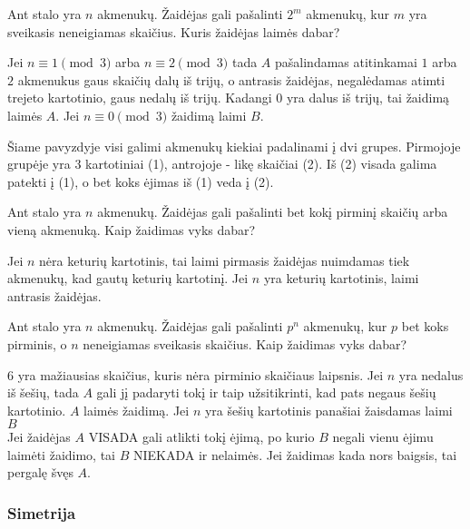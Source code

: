 \begin{pavnr}
  Ant stalo yra $n$ akmenukų. Žaidėjas gali pašalinti $2^{m}$ akmenukų, kur
  $m$ yra sveikasis neneigiamas skaičius. Kuris žaidėjas laimės dabar?
\end{pavnr}

Jei  $ n\equiv1\pmod{3} $ arba $ n\equiv2\pmod{3} $ tada $A$ pašalindamas
atitinkamai $1$ arba $2$ akmenukus gaus skaičių dalų iš trijų, o antrasis
žaidėjas, negalėdamas atimti trejeto kartotinio, gaus nedalų iš trijų.
Kadangi $0$ yra dalus iš trijų, tai žaidimą laimės $A$. Jei $ n\equiv0\pmod{3}
$ žaidimą laimi $B$.

\begin{pastaba}Šiame pavyzdyje visi galimi akmenukų kiekiai padalinami į
  dvi grupes. Pirmojoje grupėje yra $3$ kartotiniai (1), antrojoje - likę
  skaičiai (2). Iš (2) visada galima patekti į (1), o bet koks ėjimas iš
  (1) veda į (2).
\end{pastaba} 

\begin{pavnr}
  Ant stalo yra $n$ akmenukų. Žaidėjas gali pašalinti bet kokį pirminį skaičių
  arba vieną akmenuką. Kaip žaidimas vyks dabar?
\end{pavnr}

Jei $n$ nėra keturių kartotinis, tai laimi pirmasis žaidėjas nuimdamas tiek
akmenukų, kad gautų keturių kartotinį. Jei $n$ yra keturių kartotinis, laimi
antrasis žaidėjas. 

\begin{pavnr}
  Ant stalo yra $n$ akmenukų. Žaidėjas gali pašalinti $p^n$ akmenukų, kur
  $p$ bet koks pirminis, o $n$ neneigiamas sveikasis  skaičius. Kaip
  žaidimas vyks dabar?  
\end{pavnr}

$6$ yra mažiausias skaičius, kuris nėra pirminio skaičiaus laipsnis. Jei $n$
yra nedalus iš šešių, tada $A$ gali jį padaryti tokį ir taip užsitikrinti,
kad pats negaus šešių kartotinio. $A$ laimės žaidimą. Jei $n$ yra šešių
kartotinis panašiai žaisdamas laimi $B$\\

Jei žaidėjas $A$ VISADA gali atlikti tokį ėjimą, po kurio $B$ negali vienu
ėjimu laimėti žaidimo, tai $B$ NIEKADA ir nelaimės. Jei žaidimas kada nors
baigsis, tai pergalę švęs $A$. 

\subsubsection{Simetrija}

